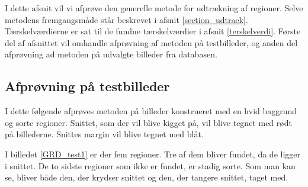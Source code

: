
{\sffamily I dette afsnit vil vi afprøve den generelle metode for udtrækning af
regioner. Selve metodens fremgangsmåde står beskrevet i afsnit
\ref{section_udtraek}. Tærskelværdierne er sat til de fundne
tærskelværdier i afsnit \ref{terskelverdi}. Første del af afsnittet vil
omhandle afprøvning af metoden på testbilleder, og anden del afprøvning
ad metoden på udvalgte billeder fra databasen.}

\subsection{Afprøvning på testbilleder}
I dette følgende afprøves metoden på billeder konstrueret med en hvid
baggrund og sorte regioner. Snittet, som der vil blive kigget på, vil
blive tegnet med rødt på billederne. Snittes margin vil blive tegnet med blåt.

I billedet \ref{GRD_test1} er der fem regioner. Tre af dem bliver
fundet, da de ligger i snittet. De to sidste regioner som ikke er fundet, er
stadig sorte. Som man kan se, bliver både den, der krydser snittet og den,
der tangere snittet, taget med. 

\begin{figure}[!h]
    \centering
    	\hspace{1em}
		\hspace{1em}
        \caption[]{}
     \label{GRD_test1_sammen}
\end{figure}


